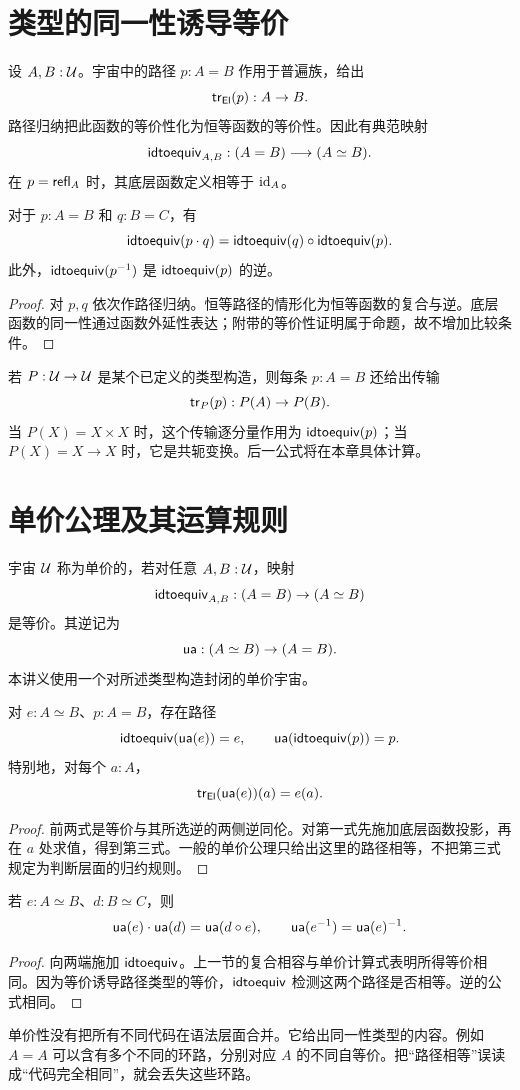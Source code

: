\section{类型的同一性诱导等价}
\begin{definition}[同一性到等价的比较]
设 $A,B:\mathcal U$。宇宙中的路径 $p:A=B$ 作用于普遍族，给出
\[
\mathsf{tr}_{\mathsf{El}}(p):A\to B.
\]
路径归纳把此函数的等价性化为恒等函数的等价性。因此有典范映射
\[
\mathsf{idtoequiv}_{A,B}:(A=B)\longrightarrow(A\simeq B).
\]
在 $p=\mathsf{refl}_A$ 时，其底层函数定义相等于 $\operatorname{id}_A$。
\end{definition}
\begin{proposition}[比较映射的复合相容]
对于 $p:A=B$ 和 $q:B=C$，有
\[
\mathsf{idtoequiv}(p\cdot q)
=\mathsf{idtoequiv}(q)\circ\mathsf{idtoequiv}(p).
\]
此外，$\mathsf{idtoequiv}(p^{-1})$ 是 $\mathsf{idtoequiv}(p)$ 的逆。
\end{proposition}
\begin{proof}
对 $p,q$ 依次作路径归纳。恒等路径的情形化为恒等函数的复合与逆。底层函数的同一性通过函数外延性表达；附带的等价性证明属于命题，故不增加比较条件。
\end{proof}
\begin{example}
若 $P:\mathcal U\to\mathcal U$ 是某个已定义的类型构造，则每条 $p:A=B$ 还给出传输
\[
\mathsf{tr}_P(p):P(A)\to P(B).
\]
当 $P(X)=X\times X$ 时，这个传输逐分量作用为 $\mathsf{idtoequiv}(p)$；当 $P(X)=X\to X$ 时，它是共轭变换。后一公式将在本章具体计算。
\end{example}

\section{单价公理及其运算规则}
\begin{definition}[单价宇宙]\label{def:univalence}
宇宙 $\mathcal U$ 称为单价的，若对任意 $A,B:\mathcal U$，映射
\[
\mathsf{idtoequiv}_{A,B}:(A=B)\to(A\simeq B)
\]
是等价。其逆记为
\[
\mathsf{ua}:(A\simeq B)\to(A=B).
\]
本讲义使用一个对所述类型构造封闭的单价宇宙。
\end{definition}
\begin{proposition}[单价性的计算与唯一性]
对 $e:A\simeq B$、$p:A=B$，存在路径
\[
\mathsf{idtoequiv}(\mathsf{ua}(e))=e,
\qquad
\mathsf{ua}(\mathsf{idtoequiv}(p))=p.
\]
特别地，对每个 $a:A$，
\[
\mathsf{tr}_{\mathsf{El}}(\mathsf{ua}(e))(a)=e(a).
\]
\end{proposition}
\begin{proof}
前两式是等价与其所选逆的两侧逆同伦。对第一式先施加底层函数投影，再在 $a$ 处求值，得到第三式。一般的单价公理只给出这里的路径相等，不把第三式规定为判断层面的归约规则。
\end{proof}
\begin{proposition}[单价性与复合]
若 $e:A\simeq B$、$d:B\simeq C$，则
\[
\mathsf{ua}(e)\cdot\mathsf{ua}(d)=\mathsf{ua}(d\circ e),
\qquad
\mathsf{ua}(e^{-1})=\mathsf{ua}(e)^{-1}.
\]
\end{proposition}
\begin{proof}
向两端施加 $\mathsf{idtoequiv}$。上一节的复合相容与单价计算式表明所得等价相同。因为等价诱导路径类型的等价，$\mathsf{idtoequiv}$ 检测这两个路径是否相等。逆的公式相同。
\end{proof}
\begin{remark}
单价性没有把所有不同代码在语法层面合并。它给出同一性类型的内容。例如 $A=A$ 可以含有多个不同的环路，分别对应 $A$ 的不同自等价。把“路径相等”误读成“代码完全相同”，就会丢失这些环路。
\end{remark}

